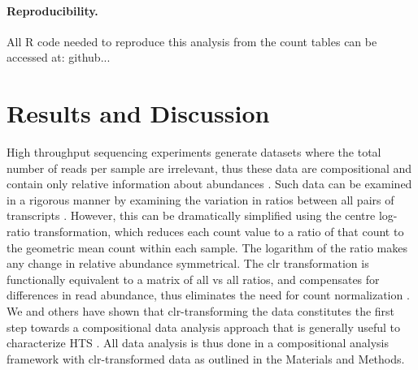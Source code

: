 \documentclass[10pt,letterpaper]{article}
\begin{document}
\paragraph{Reproducibility.} All R code needed to reproduce this analysis from the count tables can be accessed at: github...


\section*{Results and Discussion}

High throughput sequencing experiments generate datasets where the total number of reads per sample are irrelevant, thus these data are compositional and contain only relative information about abundances \cite{fernandes:2014}. Such data can be examined in a rigorous manner by examining the variation in ratios between all pairs of transcripts \cite{Aitchison:1986, pawlowsky2015modeling,pawlowsky2011compositional}. However, this can be dramatically simplified using the centre log-ratio transformation, which reduces each count value to a ratio of that count to the geometric mean count within each sample. The logarithm of the ratio makes any change in relative abundance symmetrical. The clr transformation is functionally equivalent to a matrix of all vs all ratios, and  compensates for differences in read abundance, thus eliminates the need for count normalization \cite{Lovell:2015}.  We and others have shown that clr-transforming the data constitutes the first step towards a compositional data analysis approach that is generally useful  to characterize HTS \cite{Friedman:2012, fernandes:2013,fernandes:2014,Lovell:2015}. All data analysis is thus done in a compositional analysis framework with clr-transformed data as outlined in the Materials and Methods. 

\end{document}
